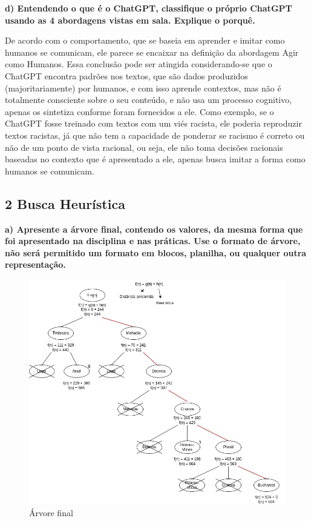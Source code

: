 \begin{adjustwidth}{1em}{}
\textbf{d) Entendendo o que é o ChatGPT, classifique o próprio ChatGPT usando as 4
abordagens vistas em sala. Explique o porquê.}
\end{adjustwidth}

De acordo com o comportamento, que se baseia em aprender e imitar como humanos se comunicam, ele parece se encaixar na definição da abordagem Agir como Humanos. Essa conclusão pode ser atingida considerando-se que o ChatGPT encontra padrões nos textos, que são dados produzidos (majoritariamente) por humanos, e com isso aprende contextos, mas não é totalmente consciente sobre o seu conteúdo, e não usa um processo cognitivo, apenas os sintetiza conforme foram fornecidos a ele. Como exemplo, se o ChatGPT fosse treinado com textos com um viés racista, ele poderia reproduzir textos racistas, já que não tem a capacidade de ponderar se racismo é correto ou não de um ponto de vista racional, ou seja, ele não toma decisões racionais baseadas no contexto que é apresentado a ele, apenas busca imitar a forma como humanos se comunicam.

\subsection*{\textbf{2 Busca Heurística}}

\begin{adjustwidth}{1em}{}
\textbf{a) Apresente a árvore final, contendo os valores, da mesma forma que foi apresentado
na disciplina e nas práticas. Use o formato de árvore, não será permitido um formato em blocos,
planilha, ou qualquer outra representação.}
\end{adjustwidth}

\begin{figure}[H]
\centering
\includegraphics[width=0.8\linewidth]{apendices/fig/1_IAA001_4.png}
\caption{Árvore final}
\label{arvoreF}
\end{figure}

